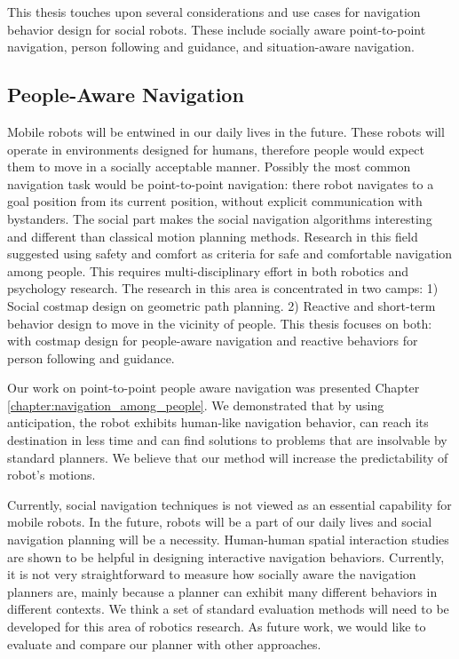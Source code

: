 This thesis touches upon several considerations and use cases for navigation behavior design for social robots. These include socially aware point-to-point navigation, person following and guidance, and situation-aware navigation.

\subsection{People-Aware Navigation}

Mobile robots will be entwined in our daily lives in the future. These robots will operate in environments designed for humans, therefore people would expect them to move in a socially acceptable manner. Possibly the most common navigation task would be point-to-point navigation: there robot navigates to a goal position from its current position, without explicit communication with bystanders. The social part makes the social navigation algorithms interesting and different than classical motion planning methods. Research in this field suggested using safety and comfort as criteria for safe and comfortable navigation among people. This requires multi-disciplinary effort in both robotics and psychology research. The research in this area is concentrated in two camps: 1) Social costmap design on geometric path planning. 2) Reactive and short-term behavior design to move in the vicinity of people. This thesis focuses on both: with costmap design for people-aware navigation and reactive behaviors for person following and guidance.

Our work on point-to-point people aware navigation was presented Chapter \ref{chapter:navigation_among_people}. We demonstrated that by using anticipation, the robot exhibits human-like navigation behavior, can reach its destination in less time and can find solutions to problems that are insolvable by standard planners. We believe that our method will increase the predictability of robot’s motions.
	
	
Currently, social navigation techniques is not viewed as an essential capability for mobile robots. In the future, robots will be a part of our daily lives and social navigation planning will be a necessity. Human-human spatial interaction studies are shown to be helpful in designing interactive navigation behaviors. Currently, it is not very straightforward to measure how socially aware the navigation planners are, mainly because a planner can exhibit many different behaviors in different contexts. We think a set of standard evaluation methods will need to be developed for this area of robotics research. As future work, we would like to evaluate and compare our planner with other approaches. 


